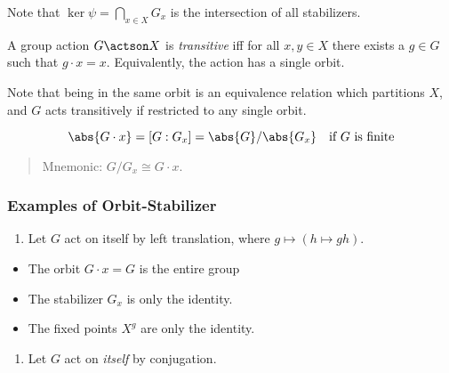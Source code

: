 Note that \(\ker \psi = \bigcap_{x\in X} G_x\) is the intersection of
all stabilizers.

\begin{definition}[Transitive]

A group action \(G\actson X\) is \emph{transitive} iff for all
\(x, y\in X\) there exists a \(g\in G\) such that \(g\cdot x = x\).
Equivalently, the action has a single orbit.

\end{definition}

Note that being in the same orbit is an equivalence relation which
partitions \(X\), and \(G\) acts transitively if restricted to any
single orbit.

\begin{theorem}

\[
\abs{G\cdot x} = [G: G_x] = \abs{G} / \abs{G_x}\quad \text{if $G$ is finite}
\]

\end{theorem}

\begin{quote}
Mnemonic: \(G/G_x \cong G\cdot x\).
\end{quote}

\hypertarget{examples-of-orbit-stabilizer}{%
\subsubsection{Examples of
Orbit-Stabilizer}\label{examples-of-orbit-stabilizer}}

\begin{enumerate}
\def\labelenumi{\arabic{enumi}.}
\tightlist
\item
  Let \(G\) act on itself by left translation, where
  \(g \mapsto (h\mapsto gh)\).
\end{enumerate}

\begin{itemize}
\tightlist
\item
  The orbit \(G\cdot x = G\) is the entire group
\item
  The stabilizer \(G_x\) is only the identity.
\item
  The fixed points \(X^g\) are only the identity.
\end{itemize}

\begin{enumerate}
\def\labelenumi{\arabic{enumi}.}
\tightlist
\item
  Let \(G\) act on \emph{itself} by conjugation.
\end{enumerate}

